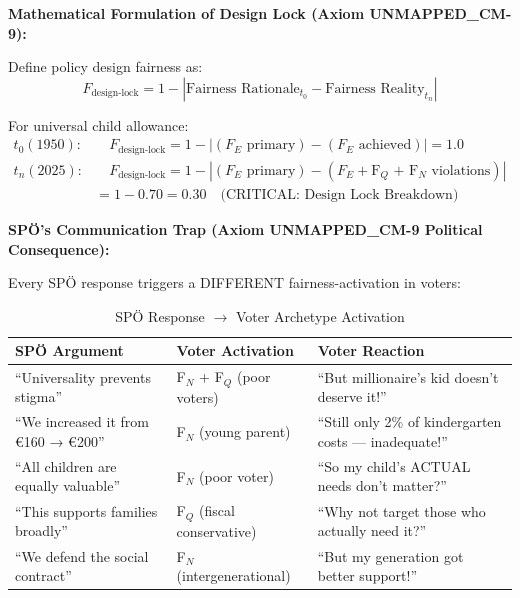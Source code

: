 \textbf{Mathematical Formulation of Design Lock (Axiom UNMAPPED_CM-9):}

Define policy design fairness as:
\begin{equation}
F_{\text{design-lock}} = 1 - |\text{Fairness Rationale}_{t_0} - \text{Fairness Reality}_{t_n}|
\end{equation}

For universal child allowance:
\begin{equation}
\begin{split}
t_0 (1950): & \quad F_{\text{design-lock}} = 1 - |(F_E \text{ primary}) - (F_E \text{ achieved})| = 1.0 \\
t_n (2025): & \quad F_{\text{design-lock}} = 1 - |(F_E \text{ primary}) - (F_E + \text{F$_Q$ + F$_N$ violations})| \\
& = 1 - 0.70 = 0.30 \quad \text{(CRITICAL: Design Lock Breakdown)}
\end{split}
\end{equation}

\textbf{SPÖ's Communication Trap (Axiom UNMAPPED_CM-9 Political Consequence):}

Every SPÖ response triggers a DIFFERENT fairness-activation in voters:

\begin{table}[htbp]
\centering
\caption{SPÖ Response $\rightarrow$ Voter Archetype Activation}
\label{tab:cm-designlock-trap}
\renewcommand{\arraystretch}{1.5}
\begin{tabular}{@{}p{3cm}p{4cm}p{4cm}@{}}
\toprule
\textbf{SPÖ Argument} & \textbf{Voter Activation} & \textbf{Voter Reaction} \\
\midrule
``Universality prevents stigma'' &
F$_N$ + F$_Q$ (poor voters) &
``But millionaire's kid doesn't deserve it!'' \\

``We increased it from €160 → €200'' &
F$_N$ (young parent) &
``Still only 2\% of kindergarten costs --- inadequate!'' \\

``All children are equally valuable'' &
F$_N$ (poor voter) &
``So my child's ACTUAL needs don't matter?'' \\

``This supports families broadly'' &
F$_Q$ (fiscal conservative) &
``Why not target those who actually need it?'' \\

``We defend the social contract'' &
F$_N$ (intergenerational) &
``But my generation got better support!'' \\

\bottomrule
\end{tabular}
\end{table}

